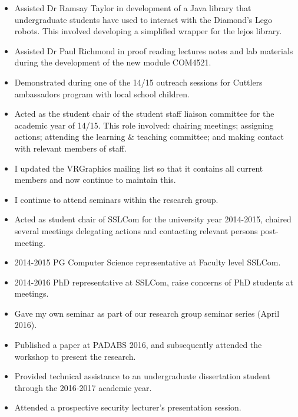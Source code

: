 \begin{itemize}
  \item Assisted Dr Ramsay Taylor in development of a Java library that undergraduate students have used to interact with the Diamond's Lego robots. This involved developing a simplified wrapper for the lejos library.
  \item Assisted Dr Paul Richmond in proof reading lectures notes and lab materials during the development of the new module COM4521.
  \item Demonstrated during one of the 14/15 outreach sessions for Cuttlers ambassadors program with local school children.
  \item Acted as the student chair of the student staff liaison committee for the academic year of 14/15. This role involved: chairing meetings; assigning actions; attending the learning \& teaching committee; and making contact with relevant members of staff.
  \item I updated the VRGraphics mailing list so that it contains all current members and now continue to maintain this.
  \item I continue to attend seminars within the research group.
  \item Acted as student chair of SSLCom for the university year 2014-2015, chaired several meetings delegating actions and contacting relevant persons post-meeting.
  \item 2014-2015 PG Computer Science representative at Faculty level SSLCom.
  \item 2014-2016 PhD representative at SSLCom, raise concerns of PhD students at meetings.
  \item Gave my own seminar as part of our research group seminar series (April 2016).
  \item Published a paper at PADABS 2016, and subsequently attended the workshop to present the research.
  \item Provided technical assistance to an undergraduate dissertation student through the 2016-2017 academic year.
  \item Attended a prospective security lecturer's presentation session. 
\end{itemize}